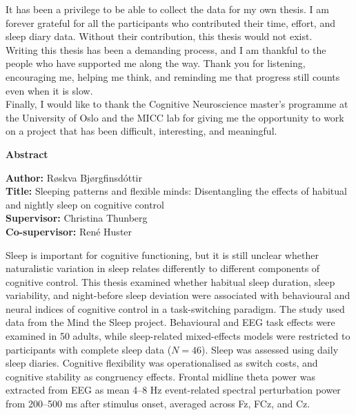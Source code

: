 \documentclass[12pt,a4paper]{report}
\begin{document}
It has been a privilege to be able to collect the data for my own thesis. I am forever grateful for all the participants who contributed their time, effort, and sleep diary data. Without their contribution, this thesis would not exist.\\

Writing this thesis has been a demanding process, and I am thankful to the people who have supported me along the way. Thank you for listening, encouraging me, helping me think, and reminding me that progress still counts even when it is slow.\\

Finally, I would like to thank the Cognitive Neuroscience master’s programme at the University of Oslo and the MICC lab for giving me the opportunity to work on a project that has been difficult, interesting, and meaningful.\\





\newpage
\thispagestyle{empty}
\begin{center}
    \Large\textbf{Abstract}
\end{center}

\noindent
\textbf{Author:} Røskva Bjørgfinsdóttir\\
\textbf{Title:} Sleeping patterns and flexible minds: Disentangling the effects of habitual and nightly sleep on cognitive control\\
\textbf{Supervisor:} Christina Thunberg \\
\textbf{Co-supervisor:} René Huster
\vspace{0.5cm}

Sleep is important for cognitive functioning, but it is still unclear whether naturalistic variation in sleep relates differently to different components of cognitive control. This thesis examined whether habitual sleep duration, sleep variability, and night-before sleep deviation were associated with behavioural and neural indices of cognitive control in a task-switching paradigm. The study used data from the Mind the Sleep project. Behavioural and EEG task effects were examined in 50 adults, while sleep-related mixed-effects models were restricted to participants with complete sleep data (\(N = 46\)). Sleep was assessed using daily sleep diaries. Cognitive flexibility was operationalised as switch costs, and cognitive stability as congruency effects. Frontal midline theta power was extracted from EEG as mean 4--8 Hz event-related spectral perturbation power from 200--500 ms after stimulus onset, averaged across Fz, FCz, and Cz.
\end{document}
